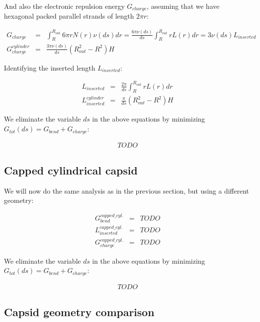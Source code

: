 \documentclass{article}
\begin{document}
And also the electronic repulsion energy $G_{charge}$, assuming that we have hexagonal packed parallel strands of length $2\pi r$:

\begin{eqnarray}
    G_{charge} & = & \int_{R}^{R_{out}} 6 \pi r N(r) \nu(ds) dr = \frac{6 \pi \nu(ds)}{ds} \int_{R}^{R_{out}} r L(r) dr = 3 \nu(ds) L_{inserted} \\
    G_{charge}^{cylinder} & = & \frac{3 \pi \nu(ds)}{ds} \left( R_{out}^2 - R^2 \right) H
\end{eqnarray}

Identifying the inserted length $L_{inserted}$:

\begin{eqnarray}
    L_{inserted} & = & \frac{2 \pi}{ds} \int_{R}^{R_{out}} r L(r) dr \\
    L_{inserted}^{cylinder} & = & \frac{\pi }{ds} \left( R_{out}^2 - R^2 \right) H
\end{eqnarray}

We eliminate the variable $ds$ in the above equations by minimizing $G_{tot}(ds) = G_{bend} + G_{charge}$:

\begin{eqnarray}
    TODO
\end{eqnarray}

\subsection{Capped cylindrical capsid}

We will now do the same analysis as in the previous section, but using a different geometry:


\begin{eqnarray}
    G_{bend}^{capped\_cyl.} & = & TODO \\
    L_{inserted}^{capped\_cyl.} & = & TODO \\
    G_{charge}^{capped\_cyl.} & = & TODO
\end{eqnarray}

We eliminate the variable $ds$ in the above equations by minimizing $G_{tot}(ds) = G_{bend} + G_{charge}$:

\begin{eqnarray}
    TODO
\end{eqnarray}

\subsection{Capsid geometry comparison}
\end{document}
